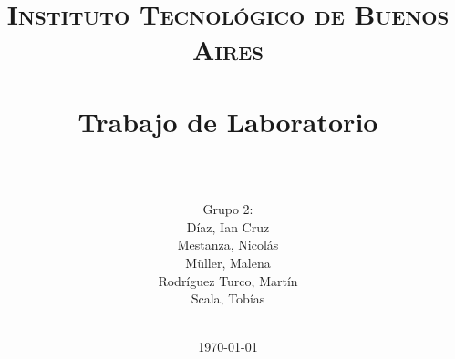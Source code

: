 









\title{
	\normalfont \normalsize \textsc{Instituto Tecnológico de Buenos Aires} \\ [25pt]
	\horrule{2pt} \\[0.4cm]
	\huge Trabajo de Laboratorio \\
	\horrule{2pt} \\[0cm]
\author{Grupo 2:\\Díaz, Ian Cruz\\Mestanza, Nicol\'as\\ Müller, Malena\\Rodr\'iguez Turco, Mart\'in\\ Scala, Tob\'ias\\ \\ }
}
\date{\today} %

\maketitle
\newpage




%
%
%
%
%


